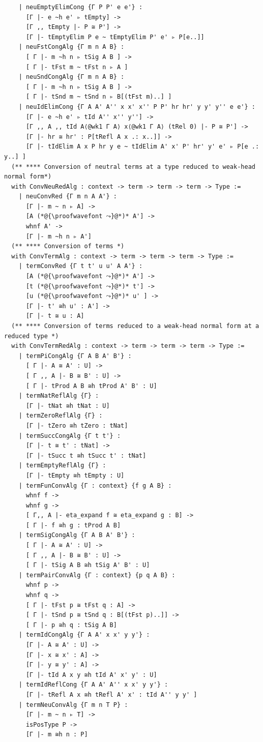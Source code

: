 \documentclass[10pt,a4paper]{amsart}
\begin{document}
\begin{lstlisting}
    | neuEmptyElimCong {Γ P P' e e'} :
      [Γ |- e ~h e' ▹ tEmpty] ->
      [Γ ,, tEmpty |- P ≅ P'] ->
      [Γ |- tEmptyElim P e ~ tEmptyElim P' e' ▹ P[e..]]
    | neuFstCongAlg {Γ m n A B} :
      [ Γ |- m ~h n ▹ tSig A B ] ->
      [ Γ |- tFst m ~ tFst n ▹ A ]
    | neuSndCongAlg {Γ m n A B} :
      [ Γ |- m ~h n ▹ tSig A B ] ->
      [ Γ |- tSnd m ~ tSnd n ▹ B[(tFst m)..] ]
    | neuIdElimCong {Γ A A' A'' x x' x'' P P' hr hr' y y' y'' e e'} :
      [Γ |- e ~h e' ▹ tId A'' x'' y''] ->
      [Γ ,, A ,, tId A⟨@wk1 Γ A⟩ x⟨@wk1 Γ A⟩ (tRel 0) |- P ≅ P'] ->
      [Γ |- hr ≅ hr' : P[tRefl A x .: x..]] ->
      [Γ |- tIdElim A x P hr y e ~ tIdElim A' x' P' hr' y' e' ▹ P[e .: y..] ]
  (** **** Conversion of neutral terms at a type reduced to weak-head normal form*)
  with ConvNeuRedAlg : context -> term -> term -> term -> Type :=
    | neuConvRed {Γ m n A A'} :
      [Γ |- m ~ n ▹ A] ->
      [A (*@{\proofwavefont ⤳}@*)* A'] ->
      whnf A' ->
      [Γ |- m ~h n ▹ A']
  (** **** Conversion of terms *)
  with ConvTermAlg : context -> term -> term -> term -> Type :=
    | termConvRed {Γ t t' u u' A A'} :
      [A (*@{\proofwavefont ⤳}@*)* A'] ->
      [t (*@{\proofwavefont ⤳}@*)* t'] ->
      [u (*@{\proofwavefont ⤳}@*)* u' ] ->
      [Γ |- t' ≅h u' : A'] ->
      [Γ |- t ≅ u : A]
  (** **** Conversion of terms reduced to a weak-head normal form at a reduced type *)
  with ConvTermRedAlg : context -> term -> term -> term -> Type :=
    | termPiCongAlg {Γ A B A' B'} :
      [ Γ |- A ≅ A' : U] ->
      [ Γ ,, A |- B ≅ B' : U] ->
      [ Γ |- tProd A B ≅h tProd A' B' : U]
    | termNatReflAlg {Γ} :
      [Γ |- tNat ≅h tNat : U]
    | termZeroReflAlg {Γ} :
      [Γ |- tZero ≅h tZero : tNat]
    | termSuccCongAlg {Γ t t'} :
      [Γ |- t ≅ t' : tNat] ->
      [Γ |- tSucc t ≅h tSucc t' : tNat]
    | termEmptyReflAlg {Γ} :
      [Γ |- tEmpty ≅h tEmpty : U]
    | termFunConvAlg {Γ : context} {f g A B} :
      whnf f ->
      whnf g ->
      [ Γ,, A |- eta_expand f ≅ eta_expand g : B] -> 
      [ Γ |- f ≅h g : tProd A B]
    | termSigCongAlg {Γ A B A' B'} :
      [ Γ |- A ≅ A' : U] ->
      [ Γ ,, A |- B ≅ B' : U] ->
      [ Γ |- tSig A B ≅h tSig A' B' : U]
    | termPairConvAlg {Γ : context} {p q A B} :
      whnf p ->
      whnf q ->
      [ Γ |- tFst p ≅ tFst q : A] -> 
      [ Γ |- tSnd p ≅ tSnd q : B[(tFst p)..]] -> 
      [ Γ |- p ≅h q : tSig A B]
    | termIdCongAlg {Γ A A' x x' y y'} :
      [Γ |- A ≅ A' : U] ->
      [Γ |- x ≅ x' : A] ->
      [Γ |- y ≅ y' : A] ->
      [Γ |- tId A x y ≅h tId A' x' y' : U]
    | termIdReflCong {Γ A A' A'' x x' y y'} :
      [Γ |- tRefl A x ≅h tRefl A' x' : tId A'' y y' ]
    | termNeuConvAlg {Γ m n T P} :
      [Γ |- m ~ n ▹ T] ->
      isPosType P ->
      [Γ |- m ≅h n : P]


\end{lstlisting}
\end{document}
